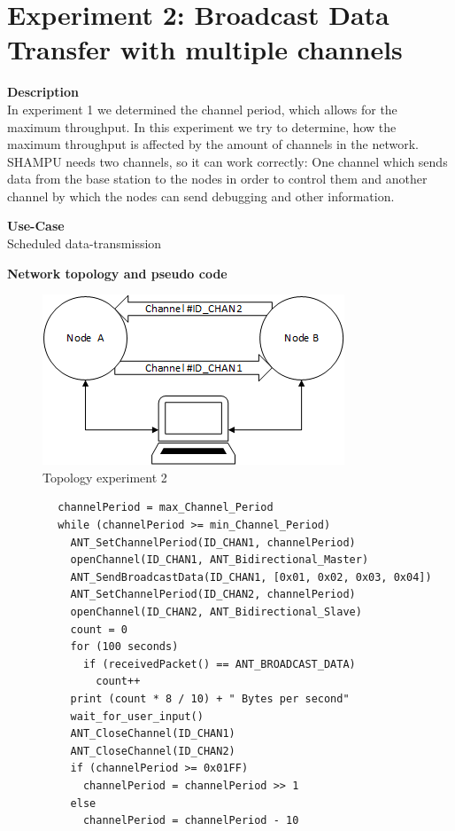 \section{Experiment 2: Broadcast Data Transfer with multiple channels}
\begin{description} 
	\item{\textbf{Description}} \hfill \\ In experiment 1 we determined the channel period, which allows for the maximum throughput. In this experiment we try to determine, how the maximum throughput is affected by the amount of channels in the network. SHAMPU needs two channels, so it can work correctly: One channel which sends data from the base station to the nodes in order to control them and another channel by which the nodes can send debugging and other information.
	\item{\textbf{Use-Case}} \hfill \\ Scheduled data-transmission	
	\item{\textbf{Network topology and pseudo code}} \hfill
	\begin{figure}[H]
		\centering
		\includegraphics[scale=1]{content/images/exp2_topo.png}
		\caption{Topology experiment 2}
	\end{figure}
	\begin{code}[H]
		\begin{verbatim}
		channelPeriod = max_Channel_Period
		while (channelPeriod >= min_Channel_Period) 
		  ANT_SetChannelPeriod(ID_CHAN1, channelPeriod)
		  openChannel(ID_CHAN1, ANT_Bidirectional_Master)
		  ANT_SendBroadcastData(ID_CHAN1, [0x01, 0x02, 0x03, 0x04])
		  ANT_SetChannelPeriod(ID_CHAN2, channelPeriod)
		  openChannel(ID_CHAN2, ANT_Bidirectional_Slave)
		  count = 0
		  for (100 seconds) 
		    if (receivedPacket() == ANT_BROADCAST_DATA)
		      count++			
		  print (count * 8 / 10) + " Bytes per second"
		  wait_for_user_input()
		  ANT_CloseChannel(ID_CHAN1)
		  ANT_CloseChannel(ID_CHAN2)
		  if (channelPeriod >= 0x01FF)
		    channelPeriod = channelPeriod >> 1
		  else
		    channelPeriod = channelPeriod - 10
		 \end{verbatim}
		\caption{Broadcast data transfer two channels (Master)}\label{lst:mExp2}
	\end{code}
	

\end{description}
